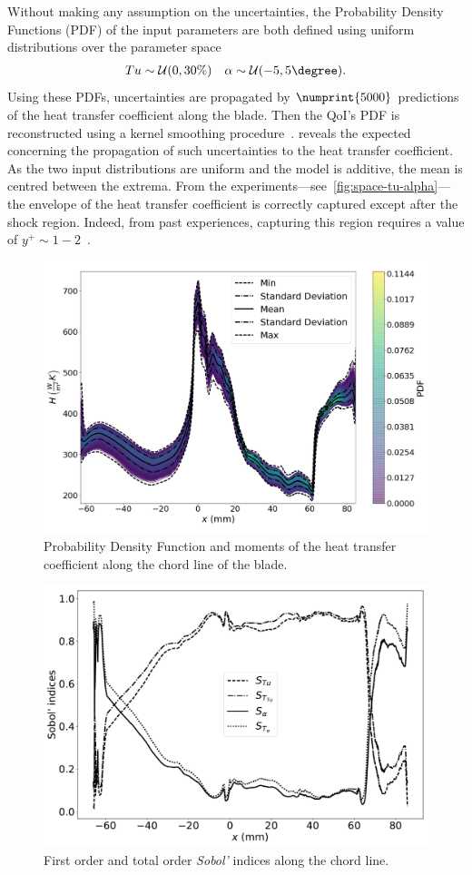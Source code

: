 Without making any assumption on the uncertainties, the Probability Density Functions (PDF) of the input parameters are both defined using uniform distributions over the parameter space
\begin{align}
Tu\sim \mathcal{U}(0,30\%) \quad \alpha \sim \mathcal{U}(-5,5\degree).
\end{align}
Using these PDFs, uncertainties are propagated by $\numprint{5000}$ predictions of the heat transfer coefficient along the blade. Then the QoI's PDF is reconstructed using a kernel smoothing procedure~\cite{Wand1995,Hastie2009}.  reveals the expected concerning the propagation of such uncertainties to the heat transfer coefficient. As the two input distributions are uniform and the model is additive, the mean is centred between the extrema. From the experiments---see~\cref{fig:space-tu-alpha}---the envelope of the heat transfer coefficient is correctly captured except after the shock region. Indeed, from past experiences, capturing this region requires a value of $y^+\sim 1-2$~\cite{Segui2017b}.

\begin{figure}[!h]
\centering
\includegraphics[width=0.7\linewidth]{fig/applications/ls89/13_2column_color-online-only_pdf-moments.pdf}
\caption{Probability Density Function and moments of the heat transfer coefficient along the chord line of the blade.}
\label{fig:ls89-propagation}
\end{figure}

\begin{figure}[h]
\centering
\includegraphics[width=0.7\linewidth]{fig/applications/ls89/14_2column_color-online-only_sensitivity_map.pdf}
\caption{First order and total order \textit{Sobol'} indices along the chord line.}
\label{fig:ls89-map}
\end{figure}

